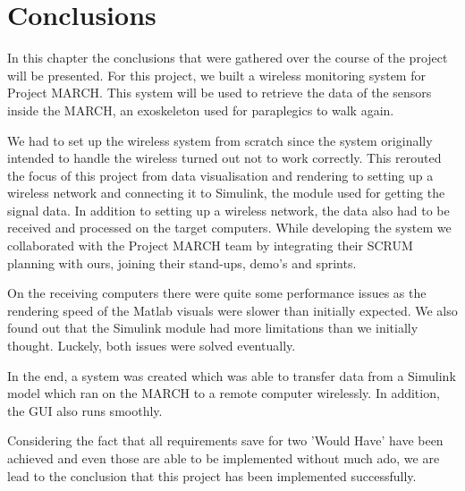 \chapter{Conclusions}
In this chapter the conclusions that were gathered over the course of the project will be presented.
\label{ch:con}
For this project, we built a wireless monitoring system for Project MARCH. This system will be used to retrieve the data of the sensors inside the MARCH, an exoskeleton used for paraplegics to walk again.

We had to set up the wireless system from scratch since the system originally intended to handle the wireless turned out not to work correctly. This rerouted the focus of this project from data visualisation and rendering to setting up a wireless network and connecting it to Simulink, the module used for getting the signal data. In addition to setting up a wireless network, the data also had to be received and processed on the target computers. While developing the system we collaborated with the Project MARCH team by integrating their SCRUM planning with ours, joining their stand-ups, demo's and sprints.

On the receiving computers there were quite some performance issues as the rendering speed of the Matlab visuals were slower than initially expected. We also found out that the Simulink module had more limitations than we initially thought. Luckely, both issues were solved eventually.

In the end, a system was created which was able to transfer data from a Simulink model which ran on the MARCH to a remote computer wirelessly. In addition, the GUI also runs smoothly. 

Considering the fact that all requirements save for two 'Would Have' have been achieved and even those are able to be implemented without much ado, we are lead to the conclusion that this project has been implemented successfully.  